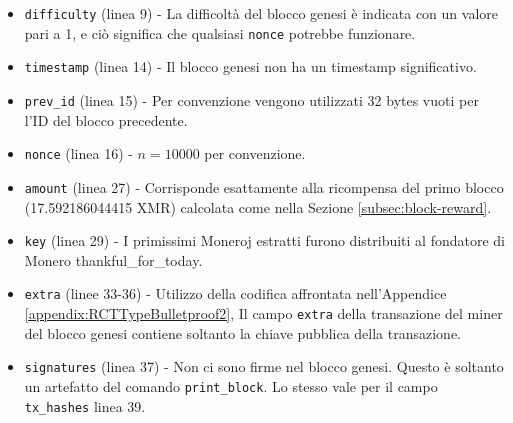 \begin{appendices}
\begin{itemize}
	\item {\tt difficulty} (linea 9) - La difficoltà del blocco genesi è indicata con un valore pari a 1, e ciò significa che qualsiasi {\tt nonce} potrebbe funzionare.
	\item {\tt timestamp} (linea 14) - Il blocco genesi non ha un timestamp significativo.
	\item {\tt prev\_id} (linea 15) - Per convenzione vengono utilizzati 32 bytes vuoti per l'ID del blocco precedente.
	\item {\tt nonce} (linea 16) - $n = 10000$ per convenzione.
	\item {\tt amount} (linea 27) - Corrisponde esattamente alla ricompensa del primo blocco (17.592186044415 XMR) calcolata come nella Sezione \ref{subsec:block-reward}.
	\item {\tt key} (linea 29) - I primissimi Moneroj estratti furono distribuiti al fondatore di Monero thankful\_for\_today.
	\item {\tt extra} (linee 33-36) - Utilizzo della codifica affrontata nell'Appendice \ref{appendix:RCTTypeBulletproof2}, Il campo {\tt extra} della transazione del miner del blocco genesi contiene soltanto la chiave pubblica della transazione.
	\item {\tt signatures} (linea 37) - Non ci sono firme nel blocco genesi. Questo è soltanto un artefatto del comando {\tt print\_block}. Lo stesso vale per il campo {\tt tx\_hashes} linea 39.
\end{itemize}


\end{appendices}